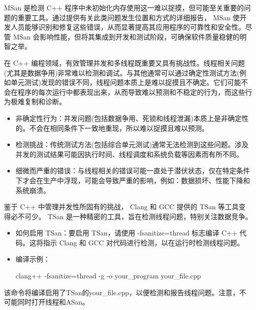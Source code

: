 MSan 是检测 C++ 程序中未初始化内存使用这一难以捉摸，但可能至关重要的问题的重要工具。通过提供有关此类问题发生位置和方式的详细报告， MSan 使开发人员能够识别和修复这些错误，从而显著提高其应用程序的可靠性和安全性。尽管 MSan 会影响性能，但将其集成到开发和测试阶段，可确保软件质量稳健的明智之举。


在 C++ 编程领域，有效管理并发和多线程既重要又具有挑战性。线程相关问题(尤其是数据争用)非常难以检测和调试。与其他通常可以通过确定性测试方法(例如单元测试)发现的错误不同，线程问题本质上是难以捉摸且不确定。它们可能不会在程序的每次运行中都表现出来，从而导致难以预测和不稳定的行为，而这些行为极难复制和诊断。


\begin{itemize}
\item
非确定性行为：并发问题(包括数据争用、死锁和线程泄漏)本质上是非确定性的。不会在相同条件下一致地重现，所以难以捉摸且难以预测。

\item
检测挑战：传统测试方法(包括综合单元测试)通常无法检测到这些问题。涉及并发的测试结果可能因执行时间、线程调度和系统负载等因素而有所不同。

\item
细微而严重的错误：与线程相关的错误可能一直处于潜伏状态，仅在特定条件下才会在生产中浮现，可能会导致严重的影响，例如：数据损坏、性能下降和系统崩溃。
\end{itemize}


鉴于 C++ 中管理并发性所固有的挑战， Clang 和 GCC 提供的 TSan 等工具变得必不可少。 TSan 是一种精密的工具，旨在检测线程问题，特别关注数据竞争。


\begin{itemize}
\item
如何启用 TSan：要启用 TSan，请使用 -fsanitize=thread 标志编译 C++ 代码。这将指示 Clang 和 GCC 对代码进行检测，以在运行时检测线程问题。

\item
编译示例：
\begin{shell}
clang++ -fsanitize=thread -g -o your_program your_file.cpp
\end{shell}
\end{itemize}

该命令将编译启用了TSan的your\_file.cpp，以便检测和报告线程问题。注意，不可能同时打开线程和ASan。

